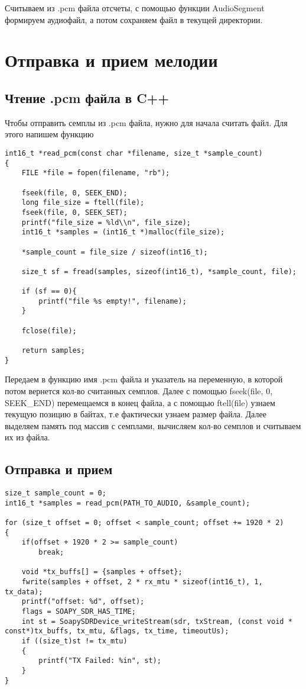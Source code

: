 Считываем из .pcm файла отсчеты, с помощью функции AudioSegment формируем аудиофайл, а потом сохраняем файл в текущей директории.

\section*{\textbf{Отправка и прием мелодии}}


\subsection*{\textbf{Чтение .pcm файла в C++}}

Чтобы отправить семплы из .pcm файла, нужно для начала считать файл. Для этого напишем функцию

\begin{lstlisting}
int16_t *read_pcm(const char *filename, size_t *sample_count)
{
    FILE *file = fopen(filename, "rb");

    fseek(file, 0, SEEK_END);
    long file_size = ftell(file);
    fseek(file, 0, SEEK_SET);
    printf("file_size = %ld\\n", file_size);
    int16_t *samples = (int16_t *)malloc(file_size);

    *sample_count = file_size / sizeof(int16_t);

    size_t sf = fread(samples, sizeof(int16_t), *sample_count, file);

    if (sf == 0){
        printf("file %s empty!", filename);
    }

    fclose(file);

    return samples;
}
\end{lstlisting}

Передаем в функцию имя .pcm файла и указатель на переменную, в которой потом вернется кол-во считанных семплов. Далее с помощью 
fseek(file, 0, SEEK\_END) перемещаемся в конец файла, а с помощью ftell(file) узнаем текущую позицию в байтах, т.е фактически
узнаем размер файла. Далее выделяем память под массив с семплами, вычисляем кол-во семплов и считываем их из файла.

\subsection*{\textbf{Отправка и прием}}

\begin{lstlisting}
size_t sample_count = 0;
int16_t *samples = read_pcm(PATH_TO_AUDIO, &sample_count);

for (size_t offset = 0; offset < sample_count; offset += 1920 * 2)
{
    if(offset + 1920 * 2 >= sample_count)
        break;

    void *tx_buffs[] = {samples + offset};
    fwrite(samples + offset, 2 * rx_mtu * sizeof(int16_t), 1, tx_data);
    printf("offset: %d", offset);
    flags = SOAPY_SDR_HAS_TIME;
    int st = SoapySDRDevice_writeStream(sdr, txStream, (const void * const*)tx_buffs, tx_mtu, &flags, tx_time, timeoutUs);
    if ((size_t)st != tx_mtu)
    {
        printf("TX Failed: %in", st);
    }        
} 
\end{lstlisting}

